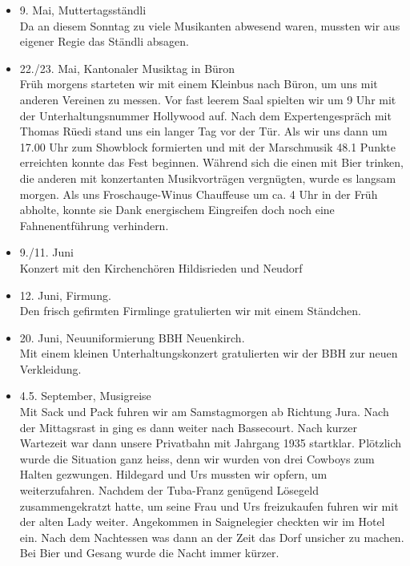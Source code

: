 \begin{history}
\begin{itemize}
        \item[]9. Mai, Muttertagsständli\\
        Da an diesem Sonntag zu viele Musikanten abwesend waren, mussten wir aus
        eigener Regie das Ständli absagen.

        \item[]22./23. Mai, Kantonaler Musiktag in Büron\\
        Früh morgens starteten wir mit einem Kleinbus nach Büron, um uns mit
        anderen Vereinen zu messen. Vor fast leerem Saal spielten wir um 9 Uhr
        mit der Unterhaltungsnummer Hollywood auf. Nach dem Expertengespräch mit
        Thomas Rüedi stand uns ein langer Tag vor der Tür. Als wir uns dann um
        17.00 Uhr zum Showblock formierten und mit der Marschmusik 48.1 Punkte
        erreichten konnte das Fest beginnen. Während sich die einen mit Bier
        trinken, die anderen mit konzertanten Musikvorträgen vergnügten, wurde
        es langsam morgen. Als uns Froschauge-Winus Chauffeuse um ca. 4 Uhr in
        der Früh abholte, konnte sie Dank energischem Eingreifen doch noch eine
        Fahnenentführung verhindern.

        \item[]9./11. Juni\\
        Konzert mit den Kirchenchören Hildisrieden und Neudorf

        \item[]12. Juni, Firmung. \\
        Den frisch gefirmten Firmlinge gratulierten wir mit einem
        Ständchen.

        \item[]20. Juni, Neuuniformierung BBH Neuenkirch.\\
        Mit einem kleinen Unterhaltungskonzert gratulierten wir der BBH zur
        neuen Verkleidung.

        \item[]4.5. September, Musigreise\\
        Mit Sack und Pack fuhren wir am Samstagmorgen ab Richtung Jura. Nach der
        Mittagsrast in ging es dann weiter nach Bassecourt. Nach kurzer
        Wartezeit war dann unsere Privatbahn mit Jahrgang 1935 startklar.
        Plötzlich wurde die Situation ganz heiss, denn wir wurden von drei
        Cowboys zum Halten gezwungen. Hildegard und Urs mussten wir opfern, um
        weiterzufahren. Nachdem der Tuba-Franz genügend Lösegeld
        zusammengekratzt hatte, um seine Frau und Urs freizukaufen fuhren wir
        mit der alten Lady weiter. Angekommen in Saignelegier checkten wir im
        Hotel ein. Nach dem Nachtessen was dann an der Zeit das Dorf unsicher zu
        machen. Bei Bier und Gesang wurde die Nacht immer kürzer.


\end{itemize}
\end{history}

